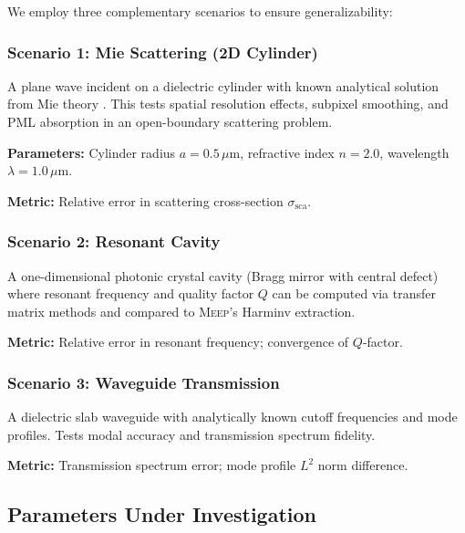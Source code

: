 \documentclass[12pt, a4paper]{article}
\newcommand{\meep}{\textsc{Meep}}
\newcommand{\pml}{\textsc{PML}}
\begin{document}
We employ three complementary scenarios to ensure generalizability:

\subsubsection{Scenario 1: Mie Scattering (2D Cylinder)}

A plane wave incident on a dielectric cylinder with known analytical solution from Mie theory \citep{Bohren1983}. This tests spatial resolution effects, subpixel smoothing, and \pml{} absorption in an open-boundary scattering problem.

\textbf{Parameters:} Cylinder radius $a = 0.5\,\mu\text{m}$, refractive index $n = 2.0$, wavelength $\lambda = 1.0\,\mu\text{m}$.

\textbf{Metric:} Relative error in scattering cross-section $\sigma_\text{sca}$.

\subsubsection{Scenario 2: Resonant Cavity}

A one-dimensional photonic crystal cavity (Bragg mirror with central defect) where resonant frequency and quality factor $Q$ can be computed via transfer matrix methods and compared to \meep{}'s Harminv extraction.

\textbf{Metric:} Relative error in resonant frequency; convergence of $Q$-factor.

\subsubsection{Scenario 3: Waveguide Transmission}

A dielectric slab waveguide with analytically known cutoff frequencies and mode profiles. Tests modal accuracy and transmission spectrum fidelity.

\textbf{Metric:} Transmission spectrum error; mode profile $L^2$ norm difference.

\subsection{Parameters Under Investigation}
\end{document}
